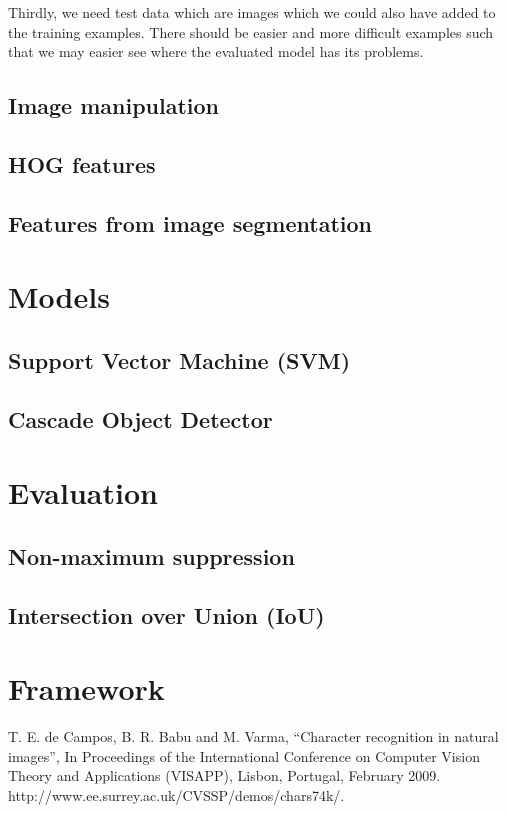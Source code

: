 \documentclass[conference]{IEEEtran}
\begin{document}
Thirdly, we need test data which are images which we could also have added to the training examples. There should be easier and more difficult examples such that we may easier see where the evaluated model has its problems.

\subsection{Image manipulation}



\subsection{HOG features}

\subsection{Features from image segmentation}

\section{Models}

\subsection{Support Vector Machine (SVM)}

\subsection{Cascade Object Detector}

\section{Evaluation}

\subsection{Non-maximum suppression}

\subsection{Intersection over Union (IoU)}

\section{Framework}

\begin{thebibliography}{00}
 T. E. de Campos, B. R. Babu and M. Varma, ``Character recognition in natural images'', In Proceedings of the International Conference on Computer Vision Theory and Applications (VISAPP), Lisbon, Portugal, February 2009. http://www.ee.surrey.ac.uk/CVSSP/demos/chars74k/.
\end{thebibliography}
\end{document}
